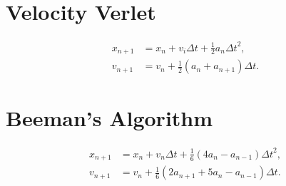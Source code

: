 \section{ Velocity Verlet }

\cite{Swope1982}

\begin{align}
    x_{n+1} &= x_{n} + v_{i} \Delta t + \frac{1}{2} a_{n}{\Delta t}^2 ,\\
    v_{n+1} &= v_{n} + \frac{1}{2} \left( a_{n} + a_{n+1} \right) \Delta t.
\end{align}


\section{ Beeman's Algorithm }

\cite{Beeman1976}

\begin{align}
    x_{n+1} &= x_{n} + v_{n} \Delta t + \frac{1}{6}\left( 4a_{n} - a_{n-1} \right) {\Delta t}^{2},\\
    v_{n+1} &= v_{n} + \frac{1}{6} \left( 2a_{n+1} + 5a_{n} - a_{n-1} \right) \Delta t.
\end{align}
